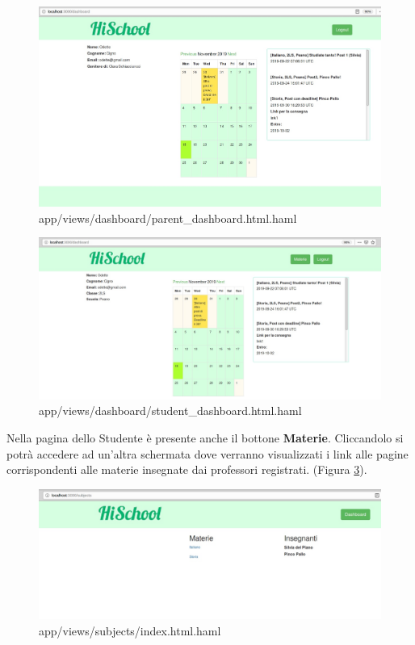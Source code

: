 \documentclass[Lau, binding=0.6cm, oneside]{sapthesis}
\begin{document}
\begin{figure}[H]
	\centering
	\includegraphics[width=1\linewidth]{images/p_dashboard} 
	\caption{app/views/dashboard/parent\_dashboard.html.haml}
	\label{fig:p_dashboard}
\end{figure}

\begin{figure}[H]
	\centering
	\includegraphics[width=1\linewidth]{images/s_dashboard} 
	\caption{app/views/dashboard/student\_dashboard.html.haml}
	\label{fig:s_dashboard}
\end{figure}

Nella pagina dello Studente è presente anche il bottone \textbf{Materie}. Cliccandolo si potrà accedere ad un'altra schermata dove verranno visualizzati i link alle pagine corrispondenti alle materie insegnate dai professori registrati. (Figura \ref{fig:materie_page}).

\begin{figure}[H]
	\centering
	\includegraphics[width=1\linewidth]{images/materie_page} 
	\caption{app/views/subjects/index.html.haml}
	\label{fig:materie_page}
\end{figure}
\end{document}

